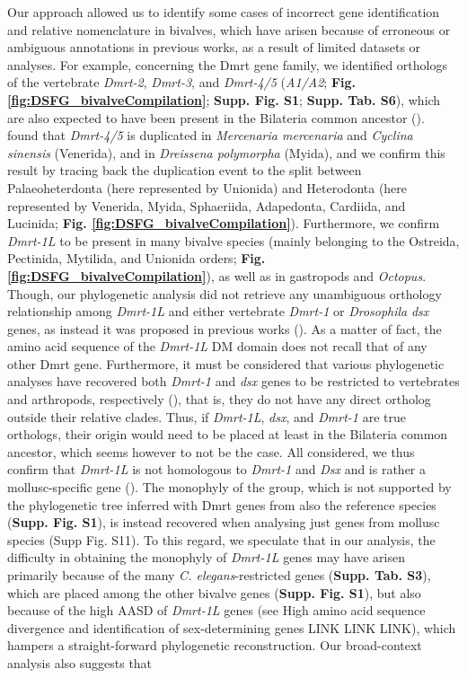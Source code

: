 \documentclass[../main.tex]{subfiles}
\begin{document}
Our approach allowed us to identify some cases of incorrect gene identification and relative nomenclature in bivalves, which have arisen because of erroneous or ambiguous annotations in previous works, as a result of limited datasets or analyses. For example, concerning the Dmrt gene family, we identified orthologs of the vertebrate \textit{Dmrt-2}, \textit{Dmrt-3}, and \textit{Dmrt-4/5} (\textit{A1/A2}; \textbf{Fig. \ref{fig:DSFG_bivalveCompilation}}; \textbf{Supp. Fig. S1}; \textbf{Supp. Tab. S6}), which are also expected to have been present in the Bilateria common ancestor (\textbf{\cite{mawaribuchi2019independent}}). \textbf{\cite{wang2023genome}} found that \textit{Dmrt-4/5} is duplicated in \textit{Mercenaria mercenaria} and \textit{Cyclina sinensis} (Venerida), and in \textit{Dreissena polymorpha} (Myida), and we confirm this result by tracing back the duplication event to the split between Palaeoheterdonta (here represented by Unionida) and Heterodonta (here represented by Venerida, Myida, Sphaeriida, Adapedonta, Cardiida, and Lucinida; \textbf{Fig. \ref{fig:DSFG_bivalveCompilation}}). Furthermore, we confirm \textit{Dmrt-1L} to be present in many bivalve species (mainly belonging to the Ostreida, Pectinida, Mytilida, and Unionida orders; \textbf{Fig. \ref{fig:DSFG_bivalveCompilation}}), as well as in gastropods and \textit{Octopus}. Though, our phylogenetic analysis did not retrieve any unambiguous orthology relationship among \textit{Dmrt-1L} and either vertebrate \textit{Dmrt-1} or \textit{Drosophila} \textit{dsx} genes, as instead it was proposed in previous works (\textbf{\cite{li2018foxl2,evensen2022comparative}}). As a matter of fact, the amino acid sequence of the \textit{Dmrt-1L} DM domain does not recall that of any other Dmrt gene. Furthermore, it must be considered that various phylogenetic analyses have recovered both \textit{Dmrt-1} and \textit{dsx} genes to be restricted to vertebrates and arthropods, respectively (\textbf{\cite{wexler2014pan,mawaribuchi2019independent,panara2019phylogenetic}}), that is, they do not have any direct ortholog outside their relative clades. Thus, if \textit{Dmrt-1L}, \textit{dsx}, and \textit{Dmrt-1} are true orthologs, their origin would need to be placed at least in the Bilateria common ancestor, which seems however to not be the case. All considered, we thus confirm that \textit{Dmrt-1L} is not homologous to \textit{Dmrt-1} and \textit{Dsx} and is rather a mollusc-specific gene (\textbf{\cite{evensen2022comparative}}). The monophyly of the group, which is not supported by the phylogenetic tree inferred with Dmrt genes from also the reference species (\textbf{Supp. Fig. S1}), is instead recovered when analysing just genes from mollusc species (Supp Fig. S11). To this regard, we speculate that in our analysis, the difficulty in obtaining the monophyly of \textit{Dmrt-1L} genes may have arisen primarily because of the many \textit{C. elegans}-restricted genes (\textbf{Supp. Tab. S3}), which are placed among the other bivalve genes (\textbf{Supp. Fig. S1}), but also because of the high AASD of \textit{Dmrt-1L} genes (see High amino acid sequence divergence and identification of sex-determining genes LINK LINK LINK), which hampers a straight-forward phylogenetic reconstruction. Our broad-context analysis also suggests that 
\end{document}
